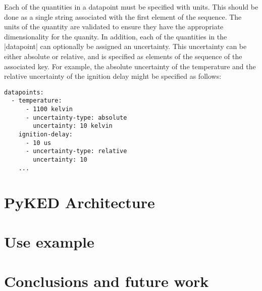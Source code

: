 \documentclass[12pt]{ussci}
\begin{document}
Each of the quantities in a datapoint must be specified with units. This should
be done as a single string associated with the first element of the sequence.
The units of the quantity are validated to ensure they have the appropriate
dimensionality for the quanity. In addition, each of the quantities in the
\yaml|datapoint| can optionally be assigned an uncertainty. This uncertainty can
be either absolute or relative, and is specified as elements of the sequence of
the associated key. For example, the absolute uncertainty of the temperature and
the relative uncertainty of the ignition delay might be specified as follows:

\begin{verbatim}
datapoints:
  - temperature:
      - 1100 kelvin
      - uncertainty-type: absolute
        uncertainty: 10 kelvin
    ignition-delay:
      - 10 us
      - uncertainty-type: relative
        uncertainty: 10
    ...
\end{verbatim}

\section{PyKED Architecture}
%

\section{Use example}
%


\section{Conclusions and future work}
%

\printbibliography
\end{document}
